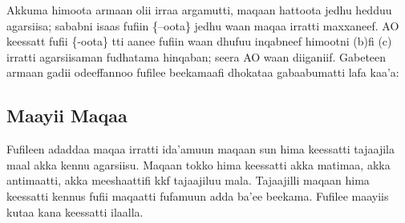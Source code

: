 \documentclass[11pt,b5paper]{book}
\begin{document}
Akkuma himoota armaan olii irraa argamutti, maqaan hattoota jedhu hedduu agarsiisa; sababni isaas fufiin \{–oota\} jedhu waan maqaa irratti maxxaneef. AO keessatt fufii \{-oota\} tti aanee fufiin waan dhufuu inqabneef himootni (b)fi (c) irratti agarsiisaman fudhatama hinqaban; seera AO waan diiganiif. Gabeteen armaan gadii odeeffannoo fufilee beekamaafi dhokataa gabaabumatti lafa kaa'a:\\

\subsection{Maayii Maqaa}

Fufileen adaddaa maqaa irratti ida'amuun maqaan sun hima keessatti tajaajila maal akka kennu agarsiisu. Maqaan tokko hima keessatti akka matimaa, akka antimaatti, akka meeshaattifi kkf tajaajiluu mala. Tajaajilli maqaan hima keessatti kennus fufii maqaatti fufamuun adda ba'ee beekama. Fufilee maayiis kutaa kana keessatti ilaalla.
\end{document}

